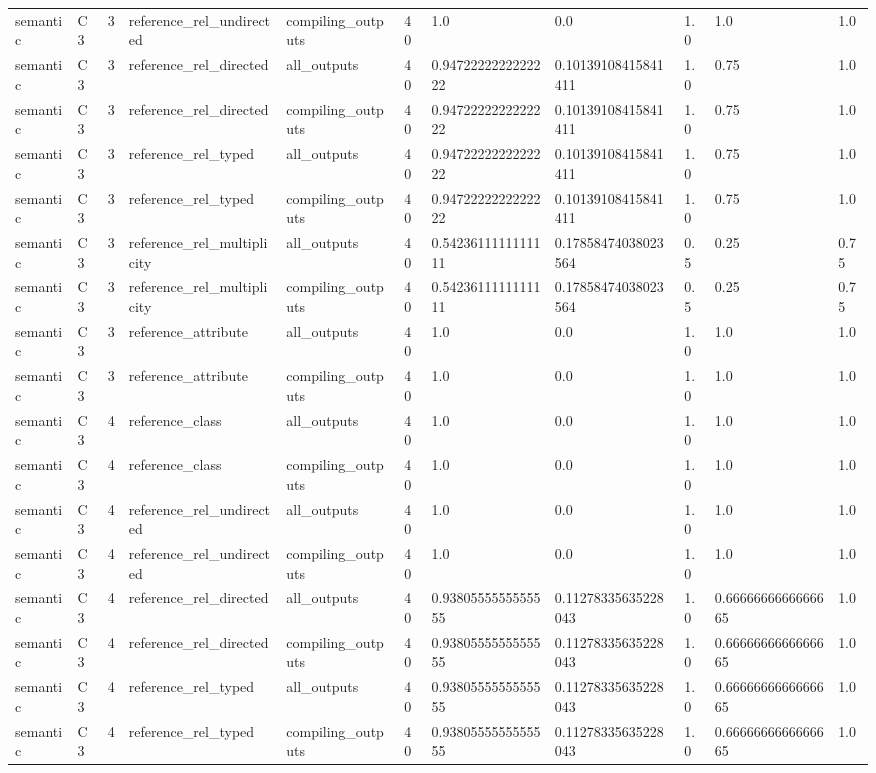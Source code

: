 \begin{tabular}{lllllllllll}
semantic & C3 & 3 & reference\_rel\_undirected & compiling\_outputs & 40 & 1.0 & 0.0 & 1.0 & 1.0 & 1.0 \\
semantic & C3 & 3 & reference\_rel\_directed & all\_outputs & 40 & 0.9472222222222222 & 0.10139108415841411 & 1.0 & 0.75 & 1.0 \\
semantic & C3 & 3 & reference\_rel\_directed & compiling\_outputs & 40 & 0.9472222222222222 & 0.10139108415841411 & 1.0 & 0.75 & 1.0 \\
semantic & C3 & 3 & reference\_rel\_typed & all\_outputs & 40 & 0.9472222222222222 & 0.10139108415841411 & 1.0 & 0.75 & 1.0 \\
semantic & C3 & 3 & reference\_rel\_typed & compiling\_outputs & 40 & 0.9472222222222222 & 0.10139108415841411 & 1.0 & 0.75 & 1.0 \\
semantic & C3 & 3 & reference\_rel\_multiplicity & all\_outputs & 40 & 0.5423611111111111 & 0.17858474038023564 & 0.5 & 0.25 & 0.75 \\
semantic & C3 & 3 & reference\_rel\_multiplicity & compiling\_outputs & 40 & 0.5423611111111111 & 0.17858474038023564 & 0.5 & 0.25 & 0.75 \\
semantic & C3 & 3 & reference\_attribute & all\_outputs & 40 & 1.0 & 0.0 & 1.0 & 1.0 & 1.0 \\
semantic & C3 & 3 & reference\_attribute & compiling\_outputs & 40 & 1.0 & 0.0 & 1.0 & 1.0 & 1.0 \\
semantic & C3 & 4 & reference\_class & all\_outputs & 40 & 1.0 & 0.0 & 1.0 & 1.0 & 1.0 \\
semantic & C3 & 4 & reference\_class & compiling\_outputs & 40 & 1.0 & 0.0 & 1.0 & 1.0 & 1.0 \\
semantic & C3 & 4 & reference\_rel\_undirected & all\_outputs & 40 & 1.0 & 0.0 & 1.0 & 1.0 & 1.0 \\
semantic & C3 & 4 & reference\_rel\_undirected & compiling\_outputs & 40 & 1.0 & 0.0 & 1.0 & 1.0 & 1.0 \\
semantic & C3 & 4 & reference\_rel\_directed & all\_outputs & 40 & 0.9380555555555555 & 0.11278335635228043 & 1.0 & 0.6666666666666665 & 1.0 \\
semantic & C3 & 4 & reference\_rel\_directed & compiling\_outputs & 40 & 0.9380555555555555 & 0.11278335635228043 & 1.0 & 0.6666666666666665 & 1.0 \\
semantic & C3 & 4 & reference\_rel\_typed & all\_outputs & 40 & 0.9380555555555555 & 0.11278335635228043 & 1.0 & 0.6666666666666665 & 1.0 \\
semantic & C3 & 4 & reference\_rel\_typed & compiling\_outputs & 40 & 0.9380555555555555 & 0.11278335635228043 & 1.0 & 0.6666666666666665 & 1.0 \\

\end{tabular}
